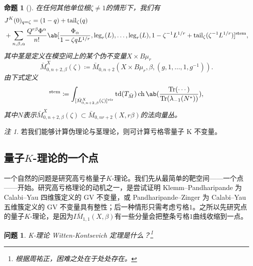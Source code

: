 \documentclass{amsart}
\newtheorem{prop}[thm]{命题}
\newtheorem{quest}[thm]{问题}
\theoremstyle{definition}
\theoremstyle{remark}
\newtheorem{rmk}[thm]{注}
\theoremstyle{plain}
\theoremstyle{definition}
\theoremstyle{remark}
\newcommand{\mr}[1]{\mathrm{#1}}
\newcommand{\on}[1]{\operatorname{#1}}
\newcommand{\1}{\mathbf{1}}
\newcommand{\2}{\mathbf{2}}
\newcommand{\3}{\mathbf{3}}
\newcommand{\vir}{\mr{vir}}
\begin{document}
\begin{prop}[{\cite{GiventalTonita2014}}]
在任何其他单位根\(\zeta \neq 1\)的情形下，我们有
    \begin{align*}
        &J^K(0)_{q = \zeta} = (1-q) + \mr{tail}_{\zeta}(q) \\
        &+ \sum_{n,\beta,\alpha} \frac{Q^{r\beta}\Phi^{\alpha}}{n!} \ab[\frac{\Phi_{\alpha}}{1-\zeta q L^{1/r}}, \mr{leg}_r(L), \ldots, \mr{leg}_r(L), 1 - \zeta^{-1}L^{1/r} + \mr{tail}_{\zeta}(\zeta^{-1} L^{1/r})]^{\mr{stem}},
    \end{align*}
其中茎是定义在模空间上的某个伪不变量\(X \times B\mu_r\)
    \[ \bar{M}_{0,n+2,\beta}^X(\zeta) \coloneqq \bar{M}_{0,n+2}(X \times B\mu_r, \beta, (g, 1, \ldots, 1, g^{-1})). \]
由下式定义
    \begin{align*}
        [\cdots]^{\mr{stem}} \coloneqq \int_{[\bar{M}_{0,n+2,\beta}^X(\zeta)]^{\vir}} \on{td}(T_{\bar{M}}) \on{ch}\ab(\frac{\on{Tr}(\cdots)}{\on{Tr}(\lambda_{-1}(N^*))}), 
    \end{align*}
其中\(N\)表示\(\bar{M}_{0,n+2,\beta}^X(\zeta) \subset \bar{M}_{0,nr+2}(X, r\beta)\)的法向量丛。
\end{prop}

\begin{rmk}
若我们能够计算伪理论与茎理论，则可计算亏格零量子 K 不变量。
\end{rmk}

\subsection{量子\(K\)-理论的一个点}%
\label{sub:Quantum K-theory of a point}

一个自然的问题是研究高亏格量子\(K\)-理论。我们先从最简单的靶空间——一个点——开始。研究高亏格理论的动机之一，是尝试证明 Klemm--Pandharipande 为 Calabi--Yau 四维簇定义的 GV 不变量，或 Pandharipande--Zinger 为 Calabi--Yau 五维簇定义的 GV 不变量具有整性；后一种情形只需考虑亏格\(1\)。之所以先研究点的量子\(K\)-理论，是因为\(I\bar{M}_{1,1}(X, \beta)\)有一些分量会把整条亏格\(1\)曲线收缩到一点。

\begin{quest}
K-理论 Witten-Kontsevich 定理是什么？\footnote{ 根据周祐正，困难之处在于处处存在。}
\end{quest}
\end{document}
